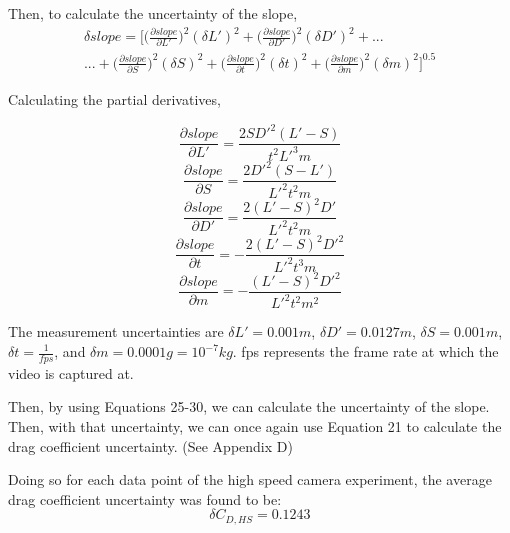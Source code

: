 \documentclass[12pt]{report}
\begin{document}
\noindent Then, to calculate the uncertainty of the slope,
\begin{multline}
	\delta slope = \bigg[\bigg(\frac{\partial slope}{\partial L'}\bigg)^2(\delta L')^2+\bigg(\frac{\partial slope}{\partial D'}\bigg)^2(\delta D')^2+...\\
	...+\bigg(\frac{\partial slope}{\partial S}\bigg)^2(\delta S)^2+\bigg(\frac{\partial slope}{\partial t}\bigg)^2(\delta t)^2+\bigg(\frac{\partial slope}{\partial m}\bigg)^2(\delta m)^2\bigg]^{0.5}
\end{multline}

\noindent Calculating the partial derivatives,

\begin{equation}
	\frac{\partial slope}{\partial L'}=\frac{2SD'^2(L'-S)}{t^2L'^3m}
\end{equation}
\begin{equation}
	\frac{\partial slope}{\partial S}=\frac{2D'^2(S-L')}{L'^2t^2m}
\end{equation}
\begin{equation}
	\frac{\partial slope}{\partial D'}=\frac{2(L'-S)^2D'}{L'^2t^2m}
\end{equation}
\begin{equation}
	\frac{\partial slope}{\partial t}=-\frac{2(L'-S)^2D'^2}{L'^2t^3m}
\end{equation}
\begin{equation}
	\frac{\partial slope}{\partial m}=-\frac{(L'-S)^2D'^2}{L'^2t^2m^2}
\end{equation}

\noindent The measurement uncertainties are $\delta L' = 0.001 m$, $\delta D' = 0.0127 m$, $\delta S = 0.001 m$, $\delta t = \frac{1}{fps}$, and $\delta m = 0.0001 g = 10^{-7} kg$. fps represents the frame rate at which the video is captured at.

\noindent Then, by using Equations 25-30, we can calculate the uncertainty of the slope. Then, with that uncertainty, we can once again use Equation 21 to calculate the drag coefficient uncertainty. (See Appendix D)

\noindent Doing so for each data point of the high speed camera experiment, the average drag coefficient uncertainty was found to be:
\begin{equation*}
	\delta C_{D,HS} = 0.1243
\end{equation*}

\newpage
\end{document}
